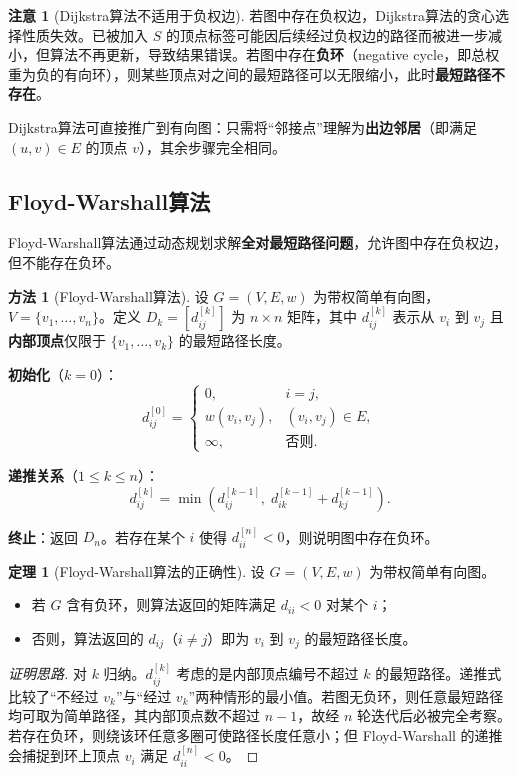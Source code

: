 \documentclass[UTF8,11pt,a4paper]{ctexbook}   %
\theoremstyle{definition}
\newtheorem{theorem}{定理}[section]
\newtheorem{warning}{注意}[section]
\newtheorem{method}{方法}[section]
\begin{document}
\begin{warning}[Dijkstra算法不适用于负权边]
若图中存在负权边，Dijkstra算法的贪心选择性质失效。已被加入 $S$ 的顶点标签可能因后续经过负权边的路径而被进一步减小，但算法不再更新，导致结果错误。若图中存在\textbf{负环}（negative cycle，即总权重为负的有向环），则某些顶点对之间的最短路径可以无限缩小，此时\textbf{最短路径不存在}。
\end{warning}

Dijkstra算法可直接推广到有向图：只需将``邻接点''理解为\textbf{出边邻居}（即满足 $(u,v)\in E$ 的顶点 $v$），其余步骤完全相同。

\subsection{Floyd-Warshall算法}

Floyd-Warshall算法通过动态规划求解\textbf{全对最短路径问题}，允许图中存在负权边，但不能存在负环。

\begin{method}[Floyd-Warshall算法]
设 $G=(V,E,w)$ 为带权简单有向图，$V=\{v_1,\dots,v_n\}$。定义 $D_k=[d_{ij}^{[k]}]$ 为 $n\times n$ 矩阵，其中 $d_{ij}^{[k]}$ 表示从 $v_i$ 到 $v_j$ 且\textbf{内部顶点}仅限于 $\{v_1,\dots,v_k\}$ 的最短路径长度。

\textbf{初始化}（$k=0$）：
\[
d_{ij}^{[0]} = 
\begin{cases}
0, & i=j,\\
w(v_i,v_j), & (v_i,v_j)\in E,\\
\infty, & \text{否则}.
\end{cases}
\]

\textbf{递推关系}（$1\le k\le n$）：
\[
d_{ij}^{[k]} = \min\!\left(d_{ij}^{[k-1]},\; d_{ik}^{[k-1]} + d_{kj}^{[k-1]}\right).
\]

\textbf{终止}：返回 $D_n$。若存在某个 $i$ 使得 $d_{ii}^{[n]}<0$，则说明图中存在负环。
\end{method}

\begin{theorem}[Floyd-Warshall算法的正确性]
设 $G=(V,E,w)$ 为带权简单有向图。
\begin{itemize}
    \item 若 $G$ 含有负环，则算法返回的矩阵满足 $d_{ii}<0$ 对某个 $i$；
    \item 否则，算法返回的 $d_{ij}$（$i\neq j$）即为 $v_i$ 到 $v_j$ 的最短路径长度。
\end{itemize}
\end{theorem}

\begin{proof}[证明思路]
对 $k$ 归纳。$d_{ij}^{[k]}$ 考虑的是内部顶点编号不超过 $k$ 的最短路径。递推式比较了``不经过 $v_k$''与``经过 $v_k$''两种情形的最小值。若图无负环，则任意最短路径均可取为简单路径，其内部顶点数不超过 $n-1$，故经 $n$ 轮迭代后必被完全考察。若存在负环，则绕该环任意多圈可使路径长度任意小；但 Floyd-Warshall 的递推会捕捉到环上顶点 $v_i$ 满足 $d_{ii}^{[n]}<0$。
\end{proof}
\end{document}
